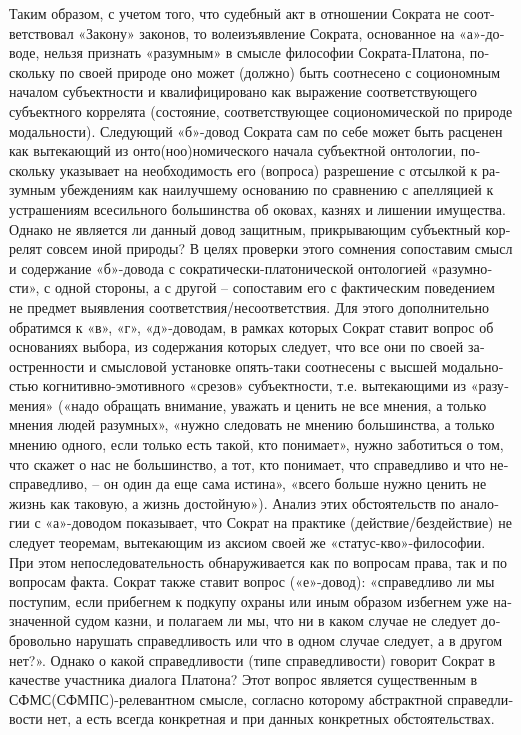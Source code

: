 \begin{russian}
    Таким образом, с учетом того, что судебный акт в отношении Сократа не соответствовал «Закону» законов, то волеизъявление Сократа, основанное на «а»-доводе, нельзя признать «разумным» в смысле   философии Сократа-Платона, поскольку по своей природе оно может (должно) быть соотнесено с социономным началом субъектности и квалифицировано как выражение соответствующего субъектного коррелята (состояние, соответствующее социономической по природе модальности).
    Следующий «б»-довод Сократа  сам по себе может быть расценен как вытекающий из онто(ноо)номического начала субъектной онтологии, поскольку указывает на необходимость его (вопроса) разрешение с отсылкой к разумным убеждениям как наилучшему основанию по сравнению с апелляцией к устрашениям всесильного большинства об оковах, казнях и лишении имущества. Однако не является ли данный довод защитным, прикрывающим субъектный коррелят совсем иной природы? В целях проверки этого сомнения сопоставим смысл и содержание «б»-довода с сократически-платонической онтологией «разумности», с одной стороны, а с другой – сопоставим его с фактическим поведением не предмет выявления соответствия/несоответствия. Для этого дополнительно обратимся к  «в», «г», «д»-доводам, в рамках которых Сократ ставит вопрос об основаниях выбора, из содержания которых следует, что все они   по своей заостренности  и смысловой установке опять-таки соотнесены с высшей модальностью когнитивно-эмотивного «срезов» субъектности, т.е. вытекающими из «разумения» («надо обращать внимание, уважать и ценить  не все мнения, а только  мнения людей разумных», «нужно следовать не мнению большинства, а только мнению одного, если только есть такой, кто понимает»,  нужно заботиться о том, что скажет о нас не большинство, а тот, кто понимает, что справедливо и что несправедливо, – он один да еще сама истина»,  «всего больше нужно ценить не жизнь как таковую, а жизнь достойную»). 
    Анализ этих обстоятельств по аналогии с «а»-доводом  показывает, что Сократ на практике (действие/бездействие) не следует теоремам, вытекающим из аксиом своей же «статус-кво»-философии. При этом непоследовательность обнаруживается как по вопросам права, так и по вопросам факта.
    Сократ также ставит вопрос («е»-довод): «справедливо ли мы поступим, если прибегнем к подкупу охраны или иным образом избегнем уже назначенной судом казни, и полагаем ли мы, что ни в каком случае не следует добровольно нарушать справедливость или что в одном случае следует, а в другом нет?».     
    Однако о какой справедливости (типе справедливости) говорит Сократ в качестве участника диалога Платона?  Этот вопрос является существенным в СФМС(СФМПС)-релевантном смысле, согласно которому абстрактной справедливости нет, а есть всегда конкретная и при данных конкретных обстоятельствах.  

\end{russian}
